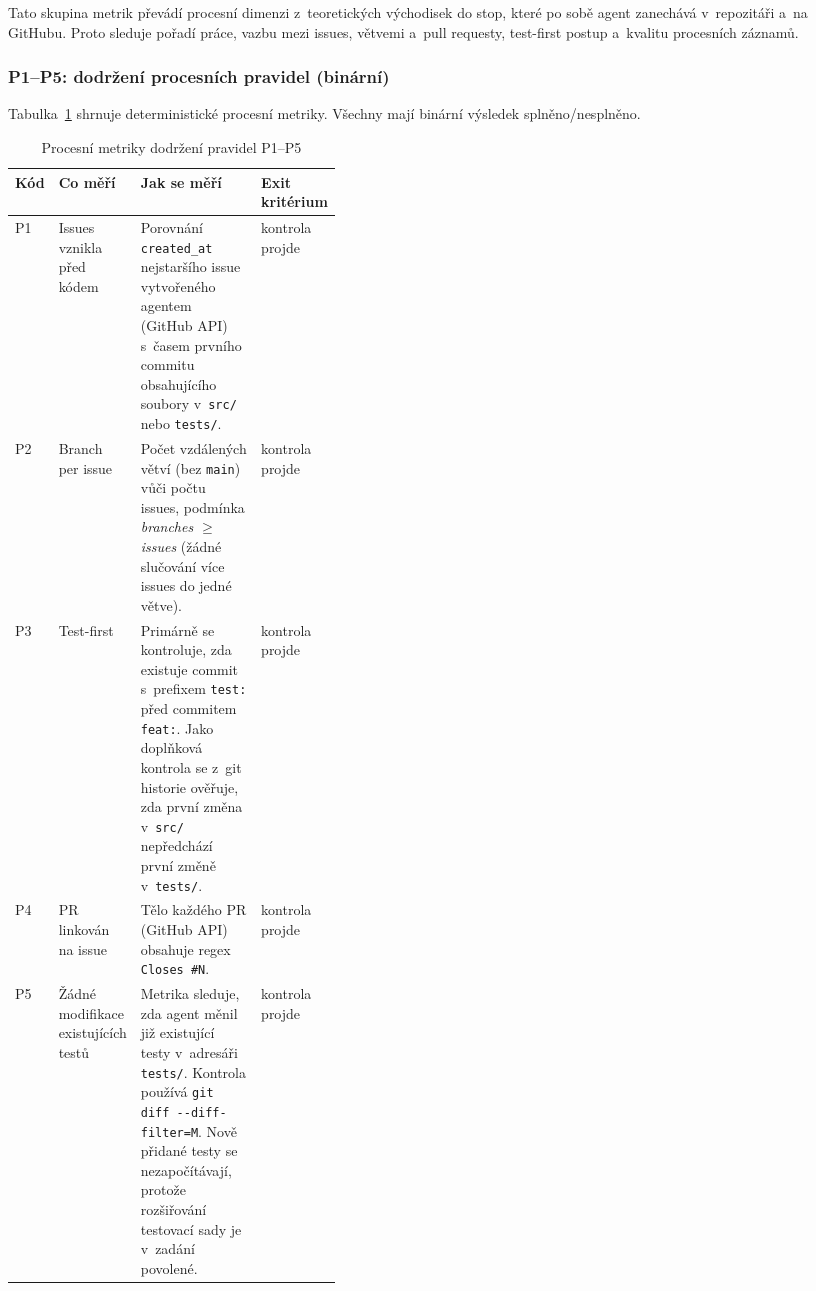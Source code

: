 Tato skupina metrik převádí procesní dimenzi z~teoretických
východisek do stop, které po sobě agent zanechává v~repozitáři
a~na GitHubu. Proto sleduje pořadí práce, vazbu mezi issues,
větvemi a~pull requesty, test-first postup a~kvalitu procesních
záznamů.

\subsubsection*{P1--P5: dodržení procesních pravidel (binární)}

Tabulka~\ref{tab:p1-p5} shrnuje deterministické procesní metriky.
Všechny mají binární výsledek splněno/nesplněno.

\begin{table}[htbp]
\centering
\caption{Procesní metriky dodržení pravidel P1--P5}
\label{tab:p1-p5}
\footnotesize
\setlength{\tabcolsep}{4pt}
\begin{tabularx}{\linewidth}{@{}lp{0.22\linewidth}Xp{0.16\linewidth}@{}}
\toprule
\textbf{Kód} & \textbf{Co měří} & \textbf{Jak se měří} & \textbf{Exit kritérium} \\
\midrule
\acs{P1} & Issues vznikla před kódem &
Porovnání \texttt{created\_at} nejstaršího issue vytvořeného agentem (GitHub API)
s~časem prvního commitu obsahujícího soubory v~\texttt{src/}
nebo \texttt{tests/}. & kontrola projde \\
\addlinespace
\acs{P2} & Branch per issue &
Počet vzdálených větví (bez \texttt{main}) vůči počtu issues, podmínka
\textit{branches $\geq$ issues} (žádné slučování více issues do jedné
větve). & kontrola projde \\
\addlinespace
\acs{P3} & Test-first &
Primárně se kontroluje, zda existuje commit s~prefixem \texttt{test:}
před commitem \texttt{feat:}. Jako doplňková kontrola se z~git historie
ověřuje, zda první změna v~\texttt{src/} nepředchází první změně
v~\texttt{tests/}. & kontrola projde \\
\addlinespace
\acs{P4} & PR linkován na issue &
Tělo každého PR (GitHub API) obsahuje regex \texttt{Closes \#N}. & kontrola projde \\
\addlinespace
\acs{P5} & Žádné modifikace existujících testů &
Metrika sleduje, zda agent měnil již existující testy v~adresáři
\texttt{tests/}. Kontrola používá \texttt{git diff -{}-diff-filter=M}.
Nově přidané testy se nezapočítávají, protože rozšiřování testovací sady
je v~zadání povolené. & kontrola projde \\
\bottomrule
\end{tabularx}
\end{table}
\FloatBarrier

